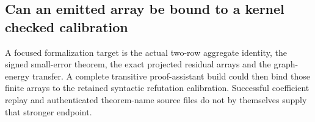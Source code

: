 \subsection{Can an emitted array be bound to a kernel checked calibration}
A focused formalization target is the actual two-row aggregate identity,
the signed small-error theorem, the exact projected residual arrays and
the graph-energy transfer. A complete transitive proof-assistant build
could then bind those finite arrays to the retained syntactic refutation
calibration. Successful coefficient replay and authenticated theorem-name
source files do not by themselves supply that stronger endpoint.
